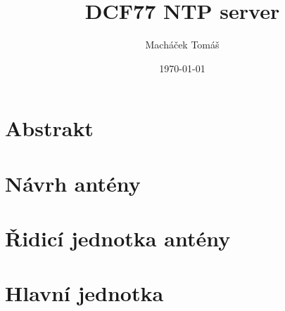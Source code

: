 \documentclass[12pt]{report}
\title{DCF77 NTP server}
\author{Macháček Tomáš}
\date{\today}
\begin{document}




\tableofcontents

\chapter{Abstrakt}


\chapter{Návrh antény}


\chapter{Řidicí jednotka antény}


\chapter{Hlavní jednotka}

\end{document}
